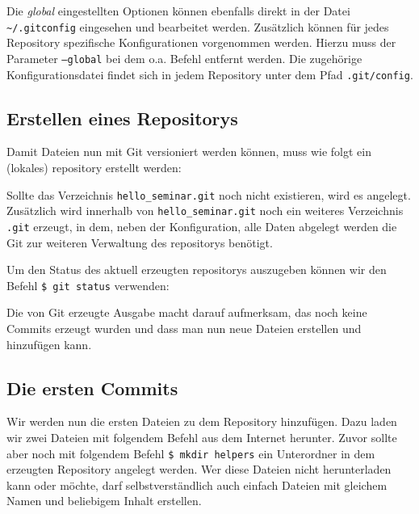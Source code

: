 Die \textit{global} eingestellten Optionen können ebenfalls direkt in der Datei
\texttt{\textasciitilde/.gitconfig} eingesehen und bearbeitet werden.
Zusätzlich können für jedes Repository spezifische Konfigurationen vorgenommen
werden. Hierzu muss der Parameter \texttt{--global} bei dem o.a. Befehl
entfernt werden. Die zugehörige Konfigurationsdatei findet sich in jedem
Repository unter dem Pfad \texttt{.git/config}. 

\subsection{Erstellen eines Repositorys}\label{startup}
Damit Dateien nun mit Git versioniert werden können, muss wie folgt ein
(lokales) \gls{repository} erstellt werden:



Sollte das Verzeichnis \texttt{hello\_seminar.git} noch nicht existieren, wird
es angelegt. Zusätzlich wird innerhalb von \texttt{hello\_seminar.git} noch ein
weiteres Verzeichnis \texttt{.git} erzeugt, in dem, neben der Konfiguration,
alle Daten abgelegt werden die Git zur weiteren Verwaltung des \glspl{repository}
benötigt.

Um den Status des aktuell erzeugten \glspl{repository} auszugeben können wir
den Befehl \texttt{\$ git status} verwenden:



Die von Git erzeugte Ausgabe macht darauf aufmerksam, das noch keine Commits
erzeugt wurden und dass man nun neue Dateien erstellen und hinzufügen kann.

\subsection{Die ersten Commits}\label{sec:first_commits}

Wir werden nun die ersten Dateien zu dem Repository hinzufügen. Dazu laden wir
zwei Dateien mit folgendem Befehl aus dem Internet herunter. Zuvor sollte aber
noch mit folgendem Befehl \texttt{\$ mkdir helpers} ein Unterordner in dem
erzeugten Repository angelegt werden. Wer diese Dateien nicht herunterladen
kann oder möchte, darf selbstverständlich auch einfach Dateien mit gleichem
Namen und beliebigem Inhalt erstellen.

